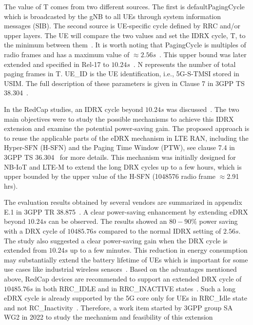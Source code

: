 \documentclass[]{IEEEtran}
\begin{document}
The value of T comes from two different sources.
The first is defaultPagingCycle which is broadcasted by the gNB to all UEs through system information messages (SIB).
The second source is UE-specific cycle defined by RRC and/or upper layers.
The UE will compare the two values and set the IDRX cycle, T, to the minimum between them~\cite{kumar2021analytical}.
It is worth noting that PagingCycle is multiples of radio frames and has a maximum value of $\approx2.56 s$~\cite{3gpp_nr_nodate-3_38.331}.
This upper bound was later extended and specified in Rel-17 to $10.24 s$~\cite{3gpp_nr_nodate-3_38.331}.
N represents the number of total paging frames in T.
UE\_ID is the UE identification, i.e., 5G-S-TMSI stored in USIM.
The full description of these parameters is given in Clause 7 in 3GPP TS 38.304~\cite{3gpp_nr_2022-10_38.304}.

In the RedCap studies, an IDRX cycle beyond  $10.24 s$ was discussed~\cite{ratasuk_reduced_2021}. 
The two main objectives were to study the possible mechanisms to achieve this IDRX extension and examine the potential power-saving gain.
The proposed approach is to reuse the applicable parts of the eDRX mechanism in LTE RAN, including the Hyper-SFN (H-SFN) and the Paging Time Window (PTW), see clause 7.4 in 3GPP TS 36.304~\cite{TS_36.304} for more details. 
This mechanism was initially designed for NB-IoT and LTE-M to extend the long DRX cycles up to a few hours, which is upper bounded by the upper value of the H-SFN (1048576 radio frame $\approx$2.91 hrs).

The evaluation results obtained by several vendors are summarized in appendix E.1 in 3GPP TR 38.875~\cite{3gpp_study_2021_38.875}.
A clear power-saving enhancement by extending eDRX beyond $10.24 s$ can be observed.
The results showed an $80-90\%$ power saving with a DRX cycle of $10485.76 s$ compared to the normal IDRX setting of $2.56 s$.
The study also suggested a clear power-saving gain when the DRX cycle is extended from $10.24 s$ up to a few minutes. 
This reduction in energy consumption may substantially extend the battery lifetime of UEs which is important for some use cases like industrial wireless sensors~\cite{veedu_toward_2022_arXiv:2203.05634}.
Based on the advantages mentioned above, RedCap devices are recommended to support an extended DRX cycle of $10485.76 s$ in both RRC\_IDLE and in RRC\_INACTIVE states~\cite{3gpp_study_2021_38.875}.
Such a long eDRX cycle is already supported by the 5G core only for UEs in RRC\_Idle state and not RC\_Inactivity~\cite{veedu_toward_2022_arXiv:2203.05634}.
Therefore, a work item started by 3GPP group SA WG2 in 2022 to study the mechanism and feasibility of this extension~\cite{3gpp_5gs_2022_SP-220803}
\end{document}
